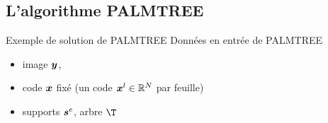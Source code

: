 \subsection{L'algorithme PALMTREE}
\begin{frame}{Exemple de solution de PALMTREE}
Données en entrée de PALMTREE
\begin{itemize}
	\item image $\bm{y}$,
	\item code $\bm{x}$ \alert{fixé} (un code $\bm{x}^l \in \mathbb{R}^N$ par feuille)
	\item supports $\bm{s}^e$, arbre $\T$
\end{itemize}
\begin{figure}\centering
{}
\end{figure}
\end{frame}


